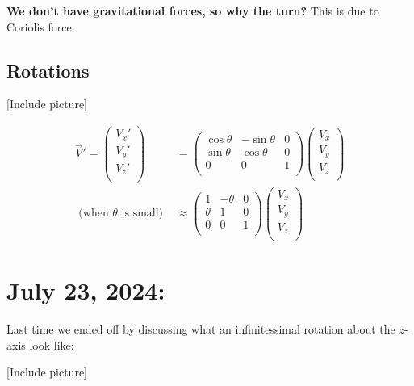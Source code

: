 \documentclass[11pt]{article}
\begin{document}
\vskip 0.5cm
\textbf{We don't have gravitational forces, so why the turn?}
This is due to Coriolis force.

\vskip 0.5cm
\subsection{Rotations}
\vskip 0.5cm
[Include picture]
\vskip 0.5cm

\begin{align*}
  \vec{V}' = \begin{pmatrix}
    V_x' \\
    V_y' \\
    V_z' \\
  \end{pmatrix} &= \begin{pmatrix}
    \cos\theta & -\sin\theta & 0 \\
    \sin\theta &  \cos\theta & 0 \\
    0 & 0 & 1 \\
  \end{pmatrix} \begin{pmatrix}
    V_x \\
    V_y \\
    V_z \\
  \end{pmatrix} \\
  \text{ (when $\theta$ is small) }  &\approx \begin{pmatrix}
    1 & -\theta & 0 \\
    \theta & 1 & 0 \\
    0 & 0 & 1 \\
  \end{pmatrix} 
  \begin{pmatrix}
      V_x \\
      V_y \\
      V_z \\
  \end{pmatrix}
\end{align*}

\pagebreak
\section{July 23, 2024: }

Last time we ended off by discussing what an infinitessimal rotation about the $z$-axis look like:

\vskip 0.5cm
[Include picture]
\vskip 0.5cm
\end{document}
